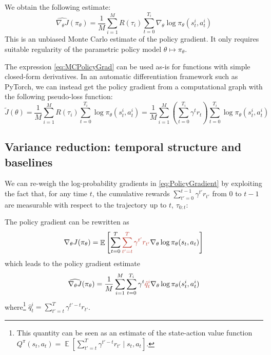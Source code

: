 \documentclass[12pt]{report}
\DeclareMathOperator{\EE}{\mathbb{E}}
\newcommand{\redfont}{\color{darkred}}
\begin{document}
We obtain the following estimate:
\begin{equation}\label{eq:MCPolicyGrad}
	\widehat{\nabla_\theta J}(\pi_\theta) =
	\frac{1}{M}\sum_{i=1}^M R(\tau_i)
	\sum_{t=0}^{T_i}
	\nabla_\theta
	\log\pi_\theta(s_t^i, a_t^i)
\end{equation}
This is an unbiased Monte Carlo estimate of the policy gradient. It only requires suitable regularity of the parametric policy model $\theta \mapsto \pi_\theta$.


\begin{remark}\label{rmk:PolicyGradPseudoLoss} The expression \eqref{eq:MCPolicyGrad} can be used as-is for functions with simple closed-form derivatives.
In an automatic differentiation framework such as {\normalfont\sffamily PyTorch}, we can instead get the policy gradient from a computational graph with the following pseudo-loss function:
\begin{equation}\label{eq:PolicyGradPseudoLoss}
	\tilde{J}(\theta) =
	\frac{1}{M}\sum_{i=1}^M R(\tau_i)
	\sum_{t=0}^{T_i} \log\pi_\theta(s_t^i, a_t^i) =
	\frac{1}{M}\sum_{i=1}^M
	\left(
		\sum_{t=0}^{T_i} \gamma^t r_{t}
	\right)
	\sum_{t=0}^{T_i} \log\pi_\theta(s_t^i, a_t^i)
\end{equation}
\end{remark}


\subsection{Variance reduction: temporal structure and baselines}

We can re-weigh the log-probability gradients in \cref{eq:PolicyGradient} by exploiting the fact that, for any time $t$, the cumulative rewards $\sum_{t'=0}^{t-1} \gamma^{t'} r_{t'}$ from $0$ to $t-1$ are measurable with respect to the trajectory up to $t$, $\tau_{0:t}$:
\begin{prop}
The policy gradient can be rewritten as
\begin{equation}
\nabla_\theta J(\pi_\theta) =
\EE\left[
	\sum_{t=0}^T
	{\redfont
		\sum_{t'=t}^T \gamma^{t'} r_{t'}
	}
	\nabla_\theta \log\pi_\theta(s_t,a_t)
\right]
\end{equation}
which leads to the policy gradient estimate
\begin{equation}
	\widehat{\nabla_\theta J}(\pi_\theta) =
	\frac{1}{M}\sum_{i=1}^M
	\sum_{t=0}^{T_i} \gamma^t
	{\redfont\hat{q}^i_t}
	\nabla_\theta \log\pi_\theta (s_t^i, a_t^i)
\end{equation}
where\footnote{This quantity can be seen as an estimate of the state-action value function $Q^\pi(s_t, a_t) = \EE[\sum_{t'=t}^T \gamma^{t'-t} r_{t'} \mid s_{t}, a_{t} ]$.} $\hat{q}^i_t = \sum_{t'=t}^T \gamma^{t'-t}r_{t'}$.
\end{prop}
\end{document}
